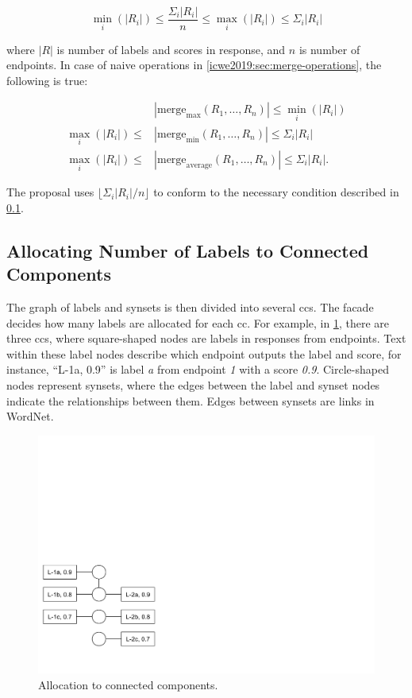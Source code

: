 \begin{equation*}
\min_i(|R_i|) \leq \frac{\Sigma_i |R_i|}{n} \leq \max_i(|R_i|) \leq \Sigma_i |R_i|
\end{equation*}

\noindent
where $|R|$ is number of labels and scores in response, and $n$ is number of endpoints.
In case of naive operations in \cref{icwe2019:sec:merge-operations}, the following is true:

\begin{align*}
&|\mathrm{merge}_\mathrm{max}(R_1, \ldots, R_n)| \leq \min_i(|R_i|) \\
\max_i(|R_i|) \leq &|\mathrm{merge}_\mathrm{min}(R_1, \ldots, R_n)| \leq \Sigma_i |R_i| \\
\max_i(|R_i|) \leq &|\mathrm{merge}_\mathrm{average}(R_1, \ldots, R_n)| \leq \Sigma_i |R_i|.
\end{align*}

\noindent
The proposal uses $\lfloor \Sigma_i |R_i|/n \rfloor$ to conform to the necessary condition described in \cref{icwe2019:sec:allocation-cc}.

\subsection{Allocating Number of Labels to Connected Components}\label{icwe2019:sec:allocation-cc}

The graph of labels and synsets is then divided into several \glspl{cc}.
The facade decides how many labels are allocated for each \gls{cc}.
For example, in \cref{icwe2019:fig:allocation}, there are three \glspl{cc}, where square-shaped nodes are labels in responses from endpoints.
Text within these label nodes describe which endpoint outputs the label and score, for instance, ``L-1a, 0.9'' is label \textit{a} from endpoint \textit{1} with a score \textit{0.9}.
Circle-shaped nodes represent synsets, where the edges between the label and synset nodes indicate the relationships between them.
Edges between synsets are links in WordNet.

\begin{figure}
\centering\includegraphics[width=.43\columnwidth,bb=0 0 329 239,clip]{figs2.pdf}
\caption[Allocation to connected components]{Allocation to connected components.}\label{icwe2019:fig:allocation}
\end{figure}

